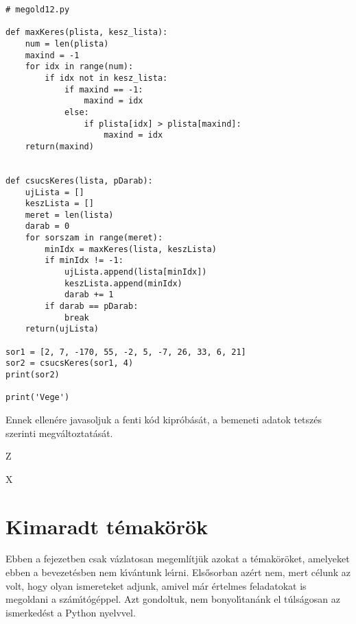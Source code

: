 \begin{Verbatim}[fontsize=\small]
# megold12.py

def maxKeres(plista, kesz_lista):
    num = len(plista)
    maxind = -1
    for idx in range(num):
        if idx not in kesz_lista:
            if maxind == -1:
                maxind = idx
            else:
                if plista[idx] > plista[maxind]:
                    maxind = idx
    return(maxind)


def csucsKeres(lista, pDarab):
    ujLista = []
    keszLista = []
    meret = len(lista)
    darab = 0
    for sorszam in range(meret):
        minIdx = maxKeres(lista, keszLista)
        if minIdx != -1:
            ujLista.append(lista[minIdx])
            keszLista.append(minIdx)
            darab += 1
        if darab == pDarab:
            break
    return(ujLista)

sor1 = [2, 7, -170, 55, -2, 5, -7, 26, 33, 6, 21]
sor2 = csucsKeres(sor1, 4)
print(sor2)

print('Vege')   
\end{Verbatim}

Ennek ellen\'ere javasoljuk a fenti k\'od kipr\'ob\'as\'at, a bemeneti adatok tetsz\'es szerinti 
megv\'altoztat\'as\'at.

\themegold

Z

\themegold

X

\setcounter{section}{10}
\section{Kimaradt t\'emak\"or\"ok}

Ebben a fejezetben csak v\'azlatosan megeml\'itj\"uk azokat a t\'emak\"or\"oket, amelyeket ebben a bevezet\'esben 
nem k\'{\i}v\'antunk le\'{\i}rni. Els\H{o}sorban az\'ert nem, mert c\'elunk az volt, hogy olyan ismereteket 
adjunk, amivel m\'ar \'ertelmes feladatokat is megoldani a sz\'am\'{\i}t\'og\'eppel. Azt gondoltuk, nem 
bonyol\'{\i}tan\'ank el t\'uls\'agosan az ismerked\'est a Python nyelvvel. 

